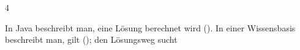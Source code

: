 \documentclass[11pt]{article}
\begin{document}
\begin{aufgabe}{4}
\begin{lueckentext}
In Java beschreibt man,  eine Lösung berechnet wird (). In einer Wissensbasis beschreibt man,  gilt (); den Lösungsweg sucht 
\end{lueckentext}
\end{aufgabe}
\end{document}
